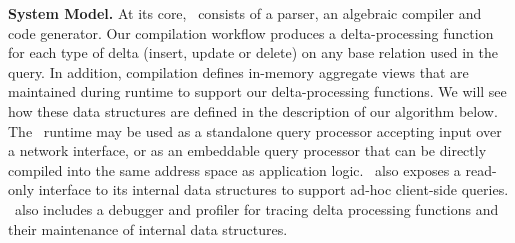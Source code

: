 \noindent\textbf{System Model.}
At its core, \compiler\ consists of a parser, an algebraic compiler and
code generator. Our compilation workflow produces a delta-processing function
for each type of delta (insert, update or delete) on any base relation used in
the query. In addition, compilation defines in-memory aggregate views that are
maintained during runtime to support our delta-processing functions. We will
see how these data structures are defined in the description of our algorithm
below. The \compiler\ runtime may be used as a standalone query processor
accepting input over a network interface, or as an embeddable query processor
that can be directly compiled into the same address space as application logic.
\compiler\ also exposes a read-only interface to its internal data structures to
support ad-hoc client-side queries. \compiler\ also includes a debugger and
profiler for tracing delta processing functions and their maintenance of
internal data structures.

